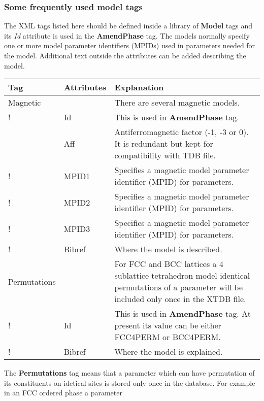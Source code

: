 \documentclass{article}
\begin{document}
\subsubsection{Some frequently used model tags}

The XML tags listed here should be defined inside a library of {\bf
  Model} tags and its {\em Id} attribute is used in the {\bf
  AmendPhase} tag.  The models normally specify one or more model
parameter identifiers (MPIDs) used in parameters needed for the model.
Additional text outside the attributes can be added describing the
model.

\bigskip
\begin{tabular}{|p{} p{} p{}|}\hline
  Tag & Attributes & Explanation\\\hline

  Magnetic & & There are several magnetic models.\\
!      & Id & This is used in {\bf AmendPhase} tag.\\
      & Aff   & Antiferromagnetic factor (-1, -3 or 0).  It is
                    redundant but kept for compatibility with TDB file.\\
!      & MPID1 & Specifies a magnetic model parameter 
                    identifier (MPID) for parameters.\\
!      & MPID2 & Specifies a magnetic model parameter 
                    identifier (MPID) for parameters.\\
!      & MPID3 & Specifies a magnetic model parameter 
                    identifier (MPID) for parameters.\\
!      & Bibref & Where the model is described.\\\hline

 Permutations & & For FCC and BCC lattices a 4 sublattice tetrahedron model
                  identical permutations of a parameter will be included 
                  only once in the XTDB file.\\
!     & Id & This is used in {\bf AmendPhase} tag.  At present its value
                   can be either FCC4PERM or BCC4PERM.\\
!     & Bibref & Where the model is explained.\\\hline

\end{tabular}

The {\bf Permutations} tag means that a parameter which can have
permutation of its constituents on idetical sites is stored only once
in the database.  For example in an FCC ordered phase a parameter
\end{document}
